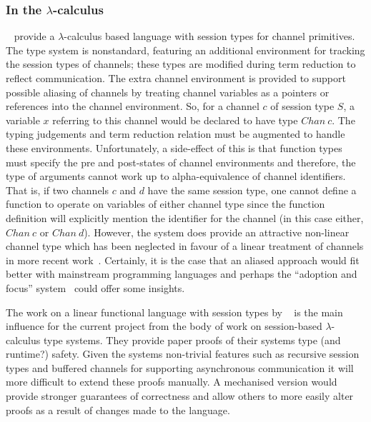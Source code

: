 \documentclass{mprop}
\begin{document}
\subsubsection{In the $\lambda$-calculus}\label{sec:lam}

\citeauthor{Gay:2008:STI}~\cite{Gay:2008:STI} provide a $\lambda$-calculus based language with session types for channel primitives. The type system is nonstandard, featuring an additional environment for tracking the session types of channels; these types are modified during term reduction to reflect communication. The extra channel environment is provided to support possible aliasing of channels by treating channel variables as a pointers or references into the channel environment. So, for a channel $c$ of session type $S$, a variable $x$ referring to this channel would be declared to have type $Chan~c$. The typing judgements and term reduction relation must be augmented to handle these environments. Unfortunately, a side-effect of this is that function types must specify the pre and post-states of channel environments and therefore, the type of arguments cannot work up to alpha-equivalence of channel identifiers. That is, if two channels $c$ and $d$ have the same session type, one cannot define a function to operate on variables of either channel type since the function definition will explicitly mention the identifier for the channel (in this case either, $Chan~c$ or $Chan~d$). However, the system does provide an attractive non-linear channel type which has been neglected in favour of a linear treatment of channels in more recent work~\cite{Gay:2010:LAST,Mazurak:2010:LCC,Wadler:2012}. Certainly, it is the case that an aliased approach would fit better with mainstream programming languages and perhaps the ``adoption and focus'' system~\cite{Fahndrich:2002} could offer some insights.

The work on a linear functional language with session types by \citeauthor{Gay:2010:LAST}~\cite{Gay:2010:LAST} is the main influence for the current project from the body of work on session-based $\lambda$-calculus type systems. They provide paper proofs of their systems type (and runtime?) safety. Given the systems non-trivial features such as recursive session types and buffered channels for supporting asynchronous communication it will more difficult to extend these proofs manually. A mechanised version would provide stronger guarantees of correctness and allow others to more easily alter proofs as a result of changes made to the language.
\end{document}
